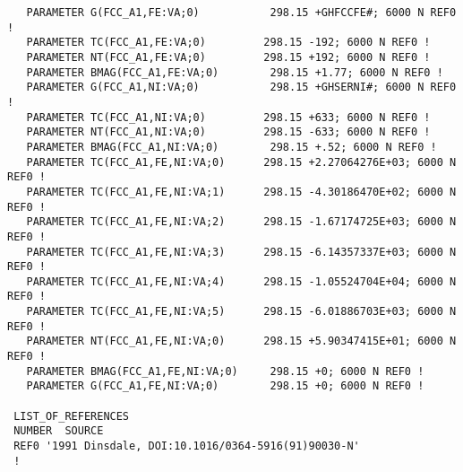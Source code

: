 \documentclass[12pt]{article}
\begin{document}
{\begin{verbatim}
   PARAMETER G(FCC_A1,FE:VA;0)           298.15 +GHFCCFE#; 6000 N REF0 !
   PARAMETER TC(FCC_A1,FE:VA;0)         298.15 -192; 6000 N REF0 !
   PARAMETER NT(FCC_A1,FE:VA;0)         298.15 +192; 6000 N REF0 !
   PARAMETER BMAG(FCC_A1,FE:VA;0)        298.15 +1.77; 6000 N REF0 !
   PARAMETER G(FCC_A1,NI:VA;0)           298.15 +GHSERNI#; 6000 N REF0 !
   PARAMETER TC(FCC_A1,NI:VA;0)         298.15 +633; 6000 N REF0 !
   PARAMETER NT(FCC_A1,NI:VA;0)         298.15 -633; 6000 N REF0 !
   PARAMETER BMAG(FCC_A1,NI:VA;0)        298.15 +.52; 6000 N REF0 !
   PARAMETER TC(FCC_A1,FE,NI:VA;0)      298.15 +2.27064276E+03; 6000 N REF0 !
   PARAMETER TC(FCC_A1,FE,NI:VA;1)      298.15 -4.30186470E+02; 6000 N REF0 !
   PARAMETER TC(FCC_A1,FE,NI:VA;2)      298.15 -1.67174725E+03; 6000 N REF0 !
   PARAMETER TC(FCC_A1,FE,NI:VA;3)      298.15 -6.14357337E+03; 6000 N REF0 !
   PARAMETER TC(FCC_A1,FE,NI:VA;4)      298.15 -1.05524704E+04; 6000 N REF0 !
   PARAMETER TC(FCC_A1,FE,NI:VA;5)      298.15 -6.01886703E+03; 6000 N REF0 !
   PARAMETER NT(FCC_A1,FE,NI:VA;0)      298.15 +5.90347415E+01; 6000 N REF0 !
   PARAMETER BMAG(FCC_A1,FE,NI:VA;0)     298.15 +0; 6000 N REF0 !
   PARAMETER G(FCC_A1,FE,NI:VA;0)        298.15 +0; 6000 N REF0 !

 LIST_OF_REFERENCES
 NUMBER  SOURCE
 REF0 '1991 Dinsdale, DOI:10.1016/0364-5916(91)90030-N'
 ! 
 
\end{verbatim}
}
  
\end{document}
